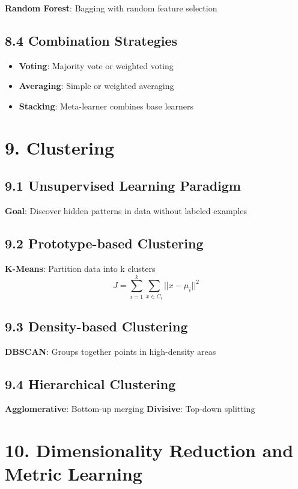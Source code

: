 \documentclass{amsart}
\theoremstyle{plain}
\theoremstyle{definition}
\theoremstyle{remark}
\begin{document}
\textbf{Random Forest}: Bagging with random feature selection

\subsection{8.4 Combination Strategies}

\begin{itemize}
	\item \textbf{Voting}: Majority vote or weighted voting
	\item \textbf{Averaging}: Simple or weighted averaging
	\item \textbf{Stacking}: Meta-learner combines base learners
\end{itemize}

\section{9. Clustering}

\subsection{9.1 Unsupervised Learning Paradigm}

\textbf{Goal}: Discover hidden patterns in data without labeled examples

\subsection{9.2 Prototype-based Clustering}

\textbf{K-Means}: Partition data into k clusters
\[
J = \sum_{i=1}^k \sum_{x \in C_i} ||x - \mu_i||^2
\]

\subsection{9.3 Density-based Clustering}

\textbf{DBSCAN}: Groups together points in high-density areas

\subsection{9.4 Hierarchical Clustering}

\textbf{Agglomerative}: Bottom-up merging
\textbf{Divisive}: Top-down splitting

\section{10. Dimensionality Reduction and Metric Learning}
\end{document}
